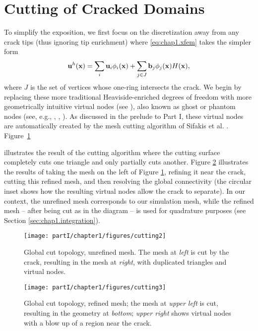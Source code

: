\section{Cutting of Cracked Domains} \label{sec:chap1.cutting}

To simplify the exposition, we first focus on the discretization away from any crack tips (thus ignoring tip enrichment) where \eqref{eq:chap1.xfem} takes the simpler form
\begin{equation*}
\mathbf{u}^h(\mathbf{x}) = \sum_i \mathbf{u}_i \phi_i(\mathbf{x}) + \sum_{j \in J} \mathbf{b}_j \phi_j(\mathbf{x}) H(\mathbf{x}),
\end{equation*}
where $J$ is the set of vertices whose one-ring intersects the crack. We begin by replacing these more traditional Heaviside-enriched degrees of freedom with more geometrically intuitive virtual nodes (see \cite{Molino05}), also known as ghost or phantom nodes (see, e.g., \cite{Song06}, \cite{Hansbo04}, \cite{Dolbow09}). As discussed in the prelude to Part I, these virtual nodes are automatically created by the mesh cutting algorithm of Sifakis et al. \cite{Sifakis07}. Figure~\ref{fig:chap1.cutting.unrefined}

 illustrates the result of the cutting algorithm where the cutting surface completely cuts one triangle and only partially cuts another. Figure \ref{fig.ch1.cutting.refined} illustrates the results of taking the mesh on the left of Figure \ref{fig:chap1.cutting.unrefined}, refining it near the crack, cutting this refined mesh, and then resolving the global connectivity (the circular inset shows how the resulting virtual nodes allow the crack to separate). In our context, the unrefined mesh corresponds to our simulation mesh, while the refined mesh -- after being cut as in the diagram -- is used for quadrature purposes (see Section \ref{sec:chap1.integration}).

\begin{figure}[htb]
\begin{center}
	\texttt{[image: partI/chapter1/figures/cutting2]}
	\caption{\captionsize  Global cut topology, unrefined mesh. The mesh at \textit{left} is cut by the crack, resulting in the mesh at \textit{right}, with duplicated triangles and virtual nodes. }
	\label{fig:chap1.cutting.unrefined}
\end{center}
\end{figure}

\begin{figure}[htb]
\begin{center}
	\texttt{[image: partI/chapter1/figures/cutting3]}
	\caption{\captionsize  Global cut topology, refined mesh; the mesh at \textit{upper left} is cut, resulting in the geometry 
		at \textit{bottom}; \textit{upper right} shows virtual nodes with a blow up of a region near the crack. }
	\label{fig.ch1.cutting.refined}
\end{center}
\end{figure}

